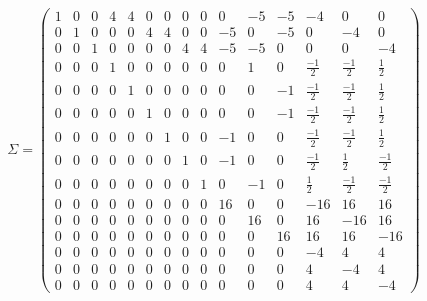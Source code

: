 \documentclass[proc]{edpsmath}
\begin{document}
  
\begin{equation*}
\Sigma = 
\begin{pmatrix}
	1 & 0 & 0 & 4 & 4 & 0 & 0 & 0 & 0 & 0 & -5 & -5 & -4 & 0 & 0  \\
	0 & 1 & 0 & 0 & 0 & 4 & 4 & 0 & 0 & -5 &  0 & -5 & 0 & -4 & 0  \\
	0 & 0 & 1 & 0 & 0 & 0 & 0 & 4 & 4 & -5 & -5 &  0 & 0 & 0 & -4  \\
	0 & 0 & 0 & 1 & 0 & 0 & 0 & 0 & 0 &  0 &  1 &  0 & \frac{-1}{2} & \frac{-1}{2} & \frac{1}{2}  \\
	0 & 0 & 0 & 0 & 1 & 0 & 0 & 0 & 0 &  0 &  0 & -1 & \frac{-1}{2} & \frac{-1}{2} & \frac{1}{2}  \\
	0 & 0 & 0 & 0 & 0 & 1 & 0 & 0 & 0 &  0 &  0 & -1 & \frac{-1}{2} & \frac{-1}{2} & \frac{1}{2}  \\
	0 & 0 & 0 & 0 & 0 & 0 & 1 & 0 & 0 & -1 &  0 &  0 & \frac{-1}{2} & \frac{-1}{2} & \frac{1}{2}  \\
	0 & 0 & 0 & 0 & 0 & 0 & 0 & 1 & 0 & -1 &  0 &  0 & \frac{-1}{2} & \frac{1}{2} & \frac{-1}{2}  \\
	0 & 0 & 0 & 0 & 0 & 0 & 0 & 0 & 1 &  0 & -1 &  0 & \frac{1}{2} & \frac{-1}{2} & \frac{-1}{2}  \\
	0 & 0 & 0 & 0 & 0 & 0 & 0 & 0 & 0 & 16 &  0 &  0 &-16 & 16 & 16 \\
	0 & 0 & 0 & 0 & 0 & 0 & 0 & 0 & 0 &  0 & 16 &  0 & 16 &-16 & 16 \\
	0 & 0 & 0 & 0 & 0 & 0 & 0 & 0 & 0 &  0 &  0 &  16 & 16 & 16 &-16 \\
	0 & 0 & 0 & 0 & 0 & 0 & 0 & 0 & 0 &  0 &  0 &  0 &-4 & 4 & 4  \\
	0 & 0 & 0 & 0 & 0 & 0 & 0 & 0 & 0 &  0 &  0 &  0 & 4 &-4 & 4  \\
	0 & 0 & 0 & 0 & 0 & 0 & 0 & 0 & 0 &  0 &  0 &  0 & 4 & 4 &-4  
\end{pmatrix}
\end{equation*}
\end{document}
